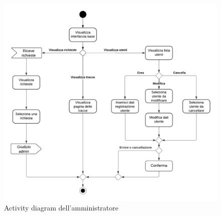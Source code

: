 \documentclass[a4paper]{article}
\begin{document}
\begin{figure}[H]
  \begin{center}
    \includegraphics[width=1\textwidth]{adAmministratore}
  \end{center}
  \caption{Activity diagram dell'amministratore}
  \label{fig:adAmministratore}
\end{figure}
\end{document}
